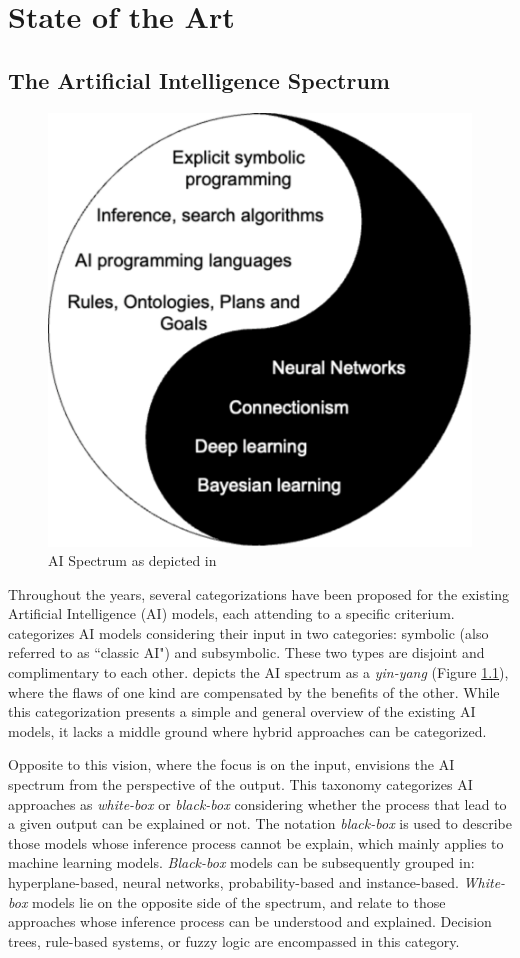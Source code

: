 \chapter{State of the Art}
\label{chap:soa}

\section{The Artificial Intelligence Spectrum} \label{sec:the_ai_spectrum}

\begin{figure}
    \centering
    \includegraphics[width=.5\linewidth]{2_stateoftheart/figures/Lieberman_taxonomy.eps}
    \caption{AI Spectrum as depicted in \cite{lieberman_symbolic_nodate}}
    \label{fig:lieberman_tax}
\end{figure}

Throughout the years, several categorizations have been proposed for the existing Artificial Intelligence (AI) models, each attending to a specific criterium. \cite{lieberman_symbolic_nodate} categorizes AI models considering their input in two categories: symbolic (also referred to as ``classic AI") and subsymbolic. These two types are disjoint and complimentary to each other. \cite{lieberman_symbolic_nodate} depicts the AI spectrum as a \textit{yin-yang} (Figure \ref{fig:lieberman_tax}), where the flaws of one kind are compensated by the benefits of the other. While this categorization presents a simple and general overview of the existing AI models, it lacks a middle ground where hybrid approaches can be categorized. 

Opposite to this vision, where the focus is on the input, \cite{loyola-gonzalez_black-box_2019} envisions the AI spectrum from the perspective of the output. This taxonomy categorizes AI approaches as \textit{white-box} or \textit{black-box} considering whether the process that lead to a given output can be explained or not. The notation \textit{black-box} is used to describe those models whose inference process cannot be explain, which mainly applies to machine learning models.  \textit{Black-box} models can be subsequently grouped in: hyperplane-based, neural networks, probability-based and instance-based. \textit{White-box} models lie on the opposite side of the spectrum, and relate to those approaches whose inference process can be understood and explained. Decision trees, rule-based systems, or fuzzy logic are encompassed in this category.


